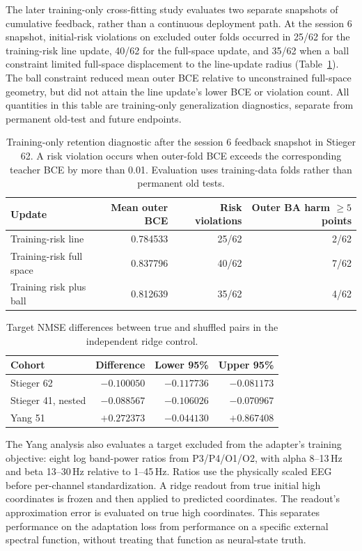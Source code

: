 \documentclass[11pt,a4paper]{article}
\begin{document}
The later training-only cross-fitting study evaluates two separate snapshots of cumulative feedback, rather than a continuous deployment path. At the session 6 snapshot, initial-risk violations on excluded outer folds occurred in 25/62 for the training-risk line update, 40/62 for the full-space update, and 35/62 when a ball constraint limited full-space displacement to the line-update radius (Table~\ref{tab:trainingretention}). The ball constraint reduced mean outer BCE relative to unconstrained full-space geometry, but did not attain the line update's lower BCE or violation count. All quantities in this table are training-only generalization diagnostics, separate from permanent old-test and future endpoints.

\begin{table}[h]
\centering\small
\caption{Training-only retention diagnostic after the session 6 feedback snapshot in Stieger 62. A risk violation occurs when outer-fold BCE exceeds the corresponding teacher BCE by more than 0.01. Evaluation uses training-data folds rather than permanent old tests.}
\label{tab:trainingretention}
\begin{tabular}{@{}lrrr@{}}
\toprule
Update & Mean outer BCE & Risk violations & Outer BA harm $\geq5$ points\\
\midrule
Training-risk line & 0.784533 & 25/62 & 2/62\\
Training-risk full space & 0.837796 & 40/62 & 7/62\\
Training risk plus ball & 0.812639 & 35/62 & 4/62\\
\bottomrule
\end{tabular}
\end{table}

\begin{table}[h]
\centering\small
\caption{Target NMSE differences between true and shuffled pairs in the independent ridge control.}
\label{tab:pairingextended}
\begin{tabular}{@{}lrrr@{}}
\toprule
Cohort & Difference & Lower 95\% & Upper 95\%\\
\midrule
Stieger 62 & $-0.100050$ & $-0.117736$ & $-0.081173$\\
Stieger 41, nested & $-0.088567$ & $-0.106026$ & $-0.070967$\\
Yang 51 & $+0.272373$ & $-0.044130$ & $+0.867408$\\
\bottomrule
\end{tabular}
\end{table}

The Yang analysis also evaluates a target excluded from the adapter's training objective: eight log band-power ratios from P3/P4/O1/O2, with alpha 8--13\,Hz and beta 13--30\,Hz relative to 1--45\,Hz. Ratios use the physically scaled EEG before per-channel standardization. A ridge readout from true initial high coordinates is frozen and then applied to predicted coordinates. The readout's approximation error is evaluated on true high coordinates. This separates performance on the adaptation loss from performance on a specific external spectral function, without treating that function as neural-state truth.
\end{document}

